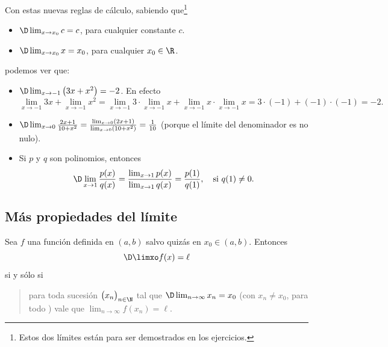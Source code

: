 \begin{example}
    Con estas nuevas reglas de cálculo, sabiendo que\footnote{Estos dos límites están para ser demostrados en los ejercicios.}
    \begin{itemize}
        \item $\D\lim_{x\to x_0} c=c$, para cualquier constante $c$.
        \item $\D\lim_{x\to x_0} x = x_0$, para cualquier $x_0\in\R$.
    \end{itemize}
    podemos ver que:
    \begin{itemize}
        \item $\D\lim_{x\to -1}  \big(3x+x^2\big) = -2$. En efecto
        \[ \lim_{x\to -1} 3x+ \lim_{x\to -1} x^2= 
        \lim_{x\to -1} 3 \cdot \lim_{x\to -1}x+ \lim_{x\to -1} x \cdot \lim_{x\to -1} x= 3\cdot(-1)+(-1)\cdot(-1)=-2.\]
        \item $\D\lim_{x\to 0} \frac{2x+1}{10+x^2}  = \frac{\lim_{x\to 0}(2x+1)}{\lim_{x\to 0}(10+x^2)}=\frac1{10}$ (porque el límite del denominador es no nulo).
        \item Si $p$ y $q$ son polinomios, entonces
        \[ 
        \D\lim_{x\to 1}  \frac{p(x)}{q(x)}  = \frac{\lim_{x\to 1}p(x)}{\lim_{x\to 1}q(x)} 
        =\frac{p(1)}{q(1)},\quad\text{si $q(1)\neq 0$.}
        \]
        
    \end{itemize}
\end{example}

\subsection{Más propiedades del límite}

\begin{theorem}\label{T:TFL}
Sea $f$ una función definida en $(a,b)$ salvo quizás en $x_0\in(a,b)$.
Entonces 
\[ \D \limxo f(x)=\ell
\]
si y sólo si 
\begin{quote}
    para toda sucesión $\big(x_n\big)_{n\in\N}$ tal que $\D\lim_{n\to\infty} x_n = x_0$ (con $x_n\neq x_0$, para todo \niN) vale que $\lim_{n\to\infty}f(x_n)=\ell$.
\end{quote}
\end{theorem}

